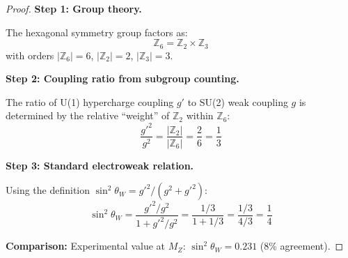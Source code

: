 \begin{proof}
\textbf{Step 1: Group theory.}

The hexagonal symmetry group factors as:
\begin{equation}
\mathbb{Z}_6 = \mathbb{Z}_2 \times \mathbb{Z}_3
\end{equation}
with orders $|\mathbb{Z}_6| = 6$, $|\mathbb{Z}_2| = 2$, $|\mathbb{Z}_3| = 3$.

\textbf{Step 2: Coupling ratio from subgroup counting.}

The ratio of U(1) hypercharge coupling $g'$ to SU(2) weak coupling $g$ is
determined by the relative ``weight'' of $\mathbb{Z}_2$ within $\mathbb{Z}_6$:
\begin{equation}
\frac{g'^2}{g^2} = \frac{|\mathbb{Z}_2|}{|\mathbb{Z}_6|} = \frac{2}{6} = \frac{1}{3}
\end{equation}

\textbf{Step 3: Standard electroweak relation.}

Using the definition $\sin^2\theta_W = g'^2/(g^2 + g'^2)$:
\begin{equation}
\sin^2\theta_W = \frac{g'^2/g^2}{1 + g'^2/g^2} = \frac{1/3}{1 + 1/3} = \frac{1/3}{4/3} = \frac{1}{4}
\end{equation}

\textbf{Comparison:} Experimental value at $M_Z$: $\sin^2\theta_W = 0.231$ (8\% agreement).
\end{proof}

